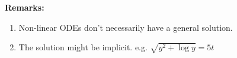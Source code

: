 \documentclass[a4paper, 10pt]{article}
\numberwithin{equation}{section}
\begin{document}
\begin{itemize}
\begin{theorem}
        \vspace{10pt}
        \textbf{Remarks:}
        \begin{enumerate}
            \item Non-linear ODEs don't necessarily have a general solution.
            \item The solution might be implicit. e.g. $\sqrt{y^2+\log y}=5t$
        \end{enumerate}
    \end{theorem}
\end{itemize}
\end{document}
